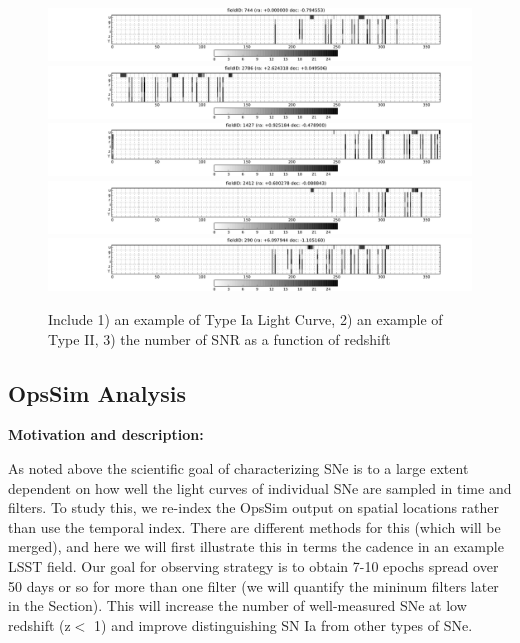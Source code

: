 \begin{figure}[!hb]
    \begin{minipage}[b]{\linewidth}
        \includegraphics[width=\textwidth]{figs/supernova/fig_firstSeason_0}
        \includegraphics[width=\textwidth]{figs/supernova/fig_firstSeason_1}
        \includegraphics[width=\textwidth]{figs/supernova/fig_firstSeason_2}
        \includegraphics[width=\textwidth]{figs/supernova/fig_firstSeason_3}
        \includegraphics[width=\textwidth]{figs/supernova/fig_firstSeason_4}
    \end{minipage}
\label{fig:opsimSummary}
\caption{Include 1) an example of Type Ia Light Curve, 2) an example of Type II, 3) the number of SNR as a function of
redshift}
\end{figure}



\subsection{OpsSim Analysis}
\label{sec:keyword:analysis}

{\bf Motivation and description:}

As noted above the scientific goal of characterizing SNe is to a large extent
dependent on how well the light curves of individual SNe are sampled in
time and filters. To study this, we re-index the OpsSim output on spatial
locations rather than use the temporal index. There are different methods for this (which will be merged), and here we will first illustrate this in terms the cadence in an example LSST field.
Our goal for observing strategy is to obtain 7-10 epochs spread over 50 days or so for more than one filter (we will quantify the mininum filters later in the Section). This will increase the number of well-measured SNe at low redshift (z$<$ 1) and improve distinguishing SN Ia from other types of SNe.

